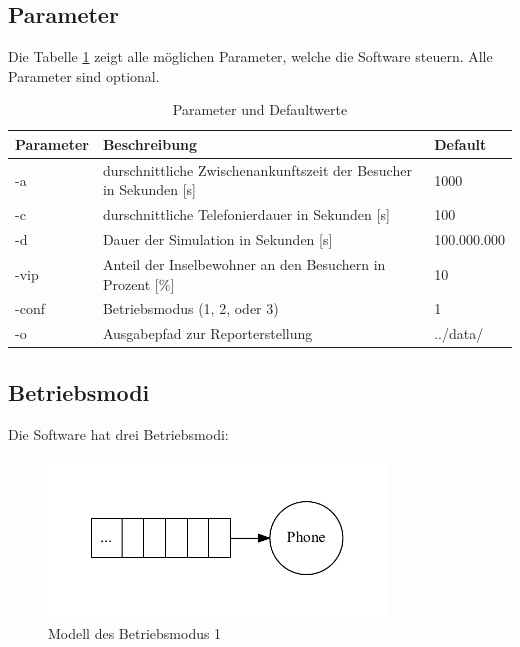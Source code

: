 \subsection{Parameter}
Die Tabelle \ref{tab:parameter} zeigt alle möglichen Parameter, welche die Software steuern. Alle Parameter sind optional.
\begin{table}[htpb]
	\centering
	\begin{tabular}{lll}
		Parameter & Beschreibung  &  Default\\ \hline
		-a & durschnittliche Zwischenankunftszeit der Besucher in Sekunden [s] & 1000 \\
		-c & durschnittliche Telefonierdauer in Sekunden [s] & 100 \\
		-d & Dauer der Simulation in Sekunden [s] & 100.000.000 \\
		-vip & Anteil der Inselbewohner an den Besuchern in Prozent [\%] &  10 \\
		-conf & Betriebsmodus (1, 2, oder 3) & 1 \\
		-o & Ausgabepfad zur Reporterstellung & ../data/
	\end{tabular}
	\caption{Parameter und Defaultwerte}
	\label{tab:parameter}
\end{table}


\subsection{Betriebsmodi}
Die Software hat drei Betriebsmodi:
\begin{figure}[htpb]
	\centering
	\includegraphics[width=0.8\textwidth]{abbildungen/modell/Betriebsmodus_1.pdf}
	\caption{Modell des Betriebsmodus 1}
	\label{fig:Betriebsmodus1}
\end{figure}

